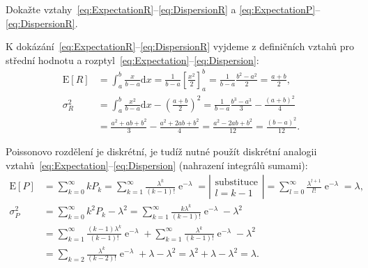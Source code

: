 \documentclass[a4paper,11pt,twoside]{article}
\DeclareMathOperator{\e}{e}             %
\renewcommand{\d}{\mathrm{d}}           %
\def\expectation#1{\mathrm{E}\left[#1\right]}
\def\dispersion#1{\sigma_{#1}^{2}}
\theoremstyle{red}
\theoremstyle{green}
\begin{document}
    \begin{solved}
        Dokažte vztahy~\eqref{eq:ExpectationR}--\eqref{eq:DispersionR} a \eqref{eq:ExpectationP}--\eqref{eq:DispersionR}.
    \end{solved}

    \begin{solution}
        K dokázání~\eqref{eq:ExpectationR}--\eqref{eq:DispersionR} vyjdeme z definičních vztahů pro střední hodnotu a rozptyl~\eqref{eq:Expectation}--\eqref{eq:Dispersion}:
        \begin{align}
            \expectation{R}
                &=\int_{a}^{b}\frac{x}{b-a}\d x
                =\frac{1}{b-a}\left[\frac{x^{2}}{2}\right]_{a}^{b}
                =\frac{1}{b-a}\frac{b^{2}-a^{2}}{2}
                =\frac{a+b}{2},\\
            \dispersion{R}
                &=\int_{a}^{b}\frac{x^{2}}{b-a}\d x-\left(\frac{a+b}{2}\right)^{2}
                =\frac{1}{b-a}\frac{b^{3}-a^{3}}{3}-\frac{(a+b)^{2}}{4}\nonumber\\
                &=\frac{a^{2}+ab+b^{2}}{3}-\frac{a^{2}+2ab+b^{2}}{4}
                =\frac{a^{2}-2ab+b^{2}}{12}=\frac{(b-a)^{2}}{12}.
        \end{align}

        Poissonovo rozdělení je diskrétní, je tudíž nutné použít diskrétní analogii vztahů~\eqref{eq:Expectation}--\eqref{eq:Dispersion} (nahrazení integrálů sumami):
        \begin{align}
            \expectation{P}
                &=\sum_{k=0}^{\infty}kP_{k}
                =\sum_{k=1}^{\infty}\frac{\lambda^{k}}{(k-1)!}\e^{-\lambda}
                =\left|\begin{array}{c}\text{substituce} \\ l=k-1\end{array}\right|
                =\sum_{l=0}^{\infty}\frac{\lambda^{l+1}}{l!}\e^{-\lambda}=\lambda,\\
            \dispersion{P}
                &=\sum_{k=0}^{\infty}k^{2}P_{k}-\lambda^{2}
                =\sum_{k=1}^{\infty}\frac{k\lambda^{k}}{(k-1)!}\e^{-\lambda}-\lambda^{2}\nonumber\\
                &=\sum_{k=1}^{\infty}\frac{(k-1)\lambda^{k}}{(k-1)!}\e^{-\lambda}+\sum_{k=1}^{\infty}\frac{\lambda^{k}}{(k-1)!}\e^{-\lambda}-\lambda^{2}\nonumber\\
                &=\sum_{k=2}\frac{\lambda^{k}}{(k-2)!}\e^{-\lambda}+\lambda-\lambda^{2}
                =\lambda^{2}+\lambda-\lambda^{2}=\lambda.
        \end{align}
    \end{solution}
\end{document}
